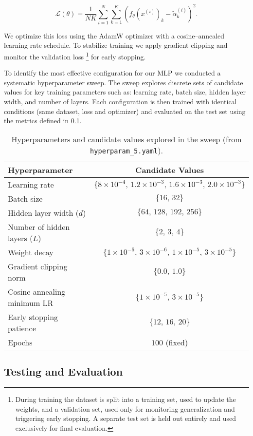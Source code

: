 \documentclass[11pt,a4paper]{article}
\numberwithin{equation}{section}
\begin{document}
\[
\mathcal{L}(\theta)=\frac{1}{NK}\sum_{i=1}^N\sum_{k=1}^K 
\left(f_\theta(x^{(i)})_k-\tilde\alpha^{(i)}_k\right)^2.
\]

We optimize this loss using the AdamW optimizer with a cosine–annealed learning rate schedule. 
To stabilize training we apply gradient clipping and monitor the validation loss%
\footnote{During training the dataset is split into a training set, used to update the weights, and a validation set, 
used only for monitoring generalization and triggering early stopping. 
A separate test set is held out entirely and used exclusively for final evaluation.} 
for early stopping. 

To identify the most effective configuration for our MLP we conducted a systematic hyperparameter sweep.
The sweep explores discrete sets of candidate values for key training parameters such as: learning rate,
batch size, hidden layer width, and number of layers. 
Each configuration is then trained with identical conditions (same dataset, loss and optimizer) and evaluated on 
the test set using the metrics defined in \cref{sec:metrics}.


\begin{table}[H]
\centering
\caption{Hyperparameters and candidate values explored in the sweep (from \texttt{hyperparam\_5.yaml}).}
\label{tab:sweep}
\begin{tabular}{lc}
\toprule
\textbf{Hyperparameter} & \textbf{Candidate Values} \\
\midrule
Learning rate & $\{8\times 10^{-4},\,1.2\times 10^{-3},\,1.6\times 10^{-3},\,2.0\times 10^{-3}\}$ \\
Batch size & $\{16,\,32\}$ \\
Hidden layer width ($d$) & $\{64,\,128,\,192,\,256\}$ \\
Number of hidden layers ($L$) & $\{2,\,3,\,4\}$ \\
Weight decay & $\{1\times 10^{-6},\,3\times 10^{-6},\,1\times 10^{-5},\,3\times 10^{-5}\}$ \\
Gradient clipping norm & $\{0.0,\,1.0\}$ \\
Cosine annealing minimum LR & $\{1\times 10^{-5},\,3\times 10^{-5}\}$ \\
Early stopping patience & $\{12,\,16,\,20\}$ \\
Epochs & $100$ (fixed) \\
\bottomrule
\end{tabular}
\end{table}


\subsection{Testing and Evaluation}
\label{sec:metrics}
\end{document}

